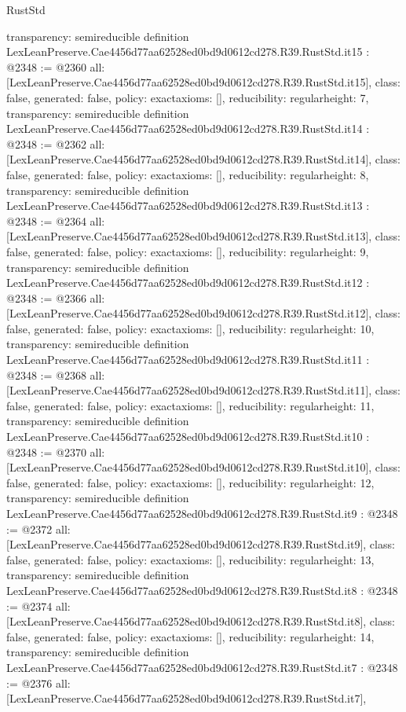 \begin{lexlean}{RustStd}
\begin{coremodule}
{  transparency: semireducible
}
definition LexLeanPreserve.Cae4456d77aa62528ed0bd9d0612cd278.R39.RustStd.it15 : @2348 := @2360 {
  all: [LexLeanPreserve.Cae4456d77aa62528ed0bd9d0612cd278.R39.RustStd.it15],
  class: false,
  generated: false,
  policy: exact{axioms: []},
  reducibility: regular{height: 7},
  transparency: semireducible
}
definition LexLeanPreserve.Cae4456d77aa62528ed0bd9d0612cd278.R39.RustStd.it14 : @2348 := @2362 {
  all: [LexLeanPreserve.Cae4456d77aa62528ed0bd9d0612cd278.R39.RustStd.it14],
  class: false,
  generated: false,
  policy: exact{axioms: []},
  reducibility: regular{height: 8},
  transparency: semireducible
}
definition LexLeanPreserve.Cae4456d77aa62528ed0bd9d0612cd278.R39.RustStd.it13 : @2348 := @2364 {
  all: [LexLeanPreserve.Cae4456d77aa62528ed0bd9d0612cd278.R39.RustStd.it13],
  class: false,
  generated: false,
  policy: exact{axioms: []},
  reducibility: regular{height: 9},
  transparency: semireducible
}
definition LexLeanPreserve.Cae4456d77aa62528ed0bd9d0612cd278.R39.RustStd.it12 : @2348 := @2366 {
  all: [LexLeanPreserve.Cae4456d77aa62528ed0bd9d0612cd278.R39.RustStd.it12],
  class: false,
  generated: false,
  policy: exact{axioms: []},
  reducibility: regular{height: 10},
  transparency: semireducible
}
definition LexLeanPreserve.Cae4456d77aa62528ed0bd9d0612cd278.R39.RustStd.it11 : @2348 := @2368 {
  all: [LexLeanPreserve.Cae4456d77aa62528ed0bd9d0612cd278.R39.RustStd.it11],
  class: false,
  generated: false,
  policy: exact{axioms: []},
  reducibility: regular{height: 11},
  transparency: semireducible
}
definition LexLeanPreserve.Cae4456d77aa62528ed0bd9d0612cd278.R39.RustStd.it10 : @2348 := @2370 {
  all: [LexLeanPreserve.Cae4456d77aa62528ed0bd9d0612cd278.R39.RustStd.it10],
  class: false,
  generated: false,
  policy: exact{axioms: []},
  reducibility: regular{height: 12},
  transparency: semireducible
}
definition LexLeanPreserve.Cae4456d77aa62528ed0bd9d0612cd278.R39.RustStd.it9 : @2348 := @2372 {
  all: [LexLeanPreserve.Cae4456d77aa62528ed0bd9d0612cd278.R39.RustStd.it9],
  class: false,
  generated: false,
  policy: exact{axioms: []},
  reducibility: regular{height: 13},
  transparency: semireducible
}
definition LexLeanPreserve.Cae4456d77aa62528ed0bd9d0612cd278.R39.RustStd.it8 : @2348 := @2374 {
  all: [LexLeanPreserve.Cae4456d77aa62528ed0bd9d0612cd278.R39.RustStd.it8],
  class: false,
  generated: false,
  policy: exact{axioms: []},
  reducibility: regular{height: 14},
  transparency: semireducible
}
definition LexLeanPreserve.Cae4456d77aa62528ed0bd9d0612cd278.R39.RustStd.it7 : @2348 := @2376 {
  all: [LexLeanPreserve.Cae4456d77aa62528ed0bd9d0612cd278.R39.RustStd.it7],
}
\end{coremodule}
\end{lexlean}
